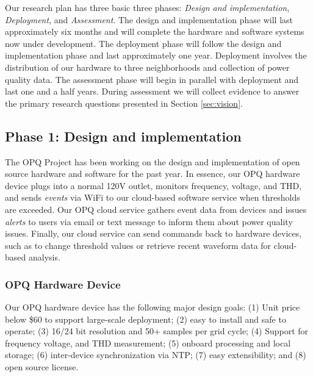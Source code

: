 \documentclass[11pt]{article}
\begin{document}

Our research plan has three basic three phases: {\em Design and implementation}, {\em Deployment}, and {\em Assessment}.  The design and implementation phase will last approximately six months and will complete the hardware and software systems now under development. The deployment phase will follow the design and implementation phase and last approximately one year. Deployment involves the distribution of our hardware to three neighborhoods and collection of power quality data.  The assessment phase will begin in parallel with deployment and last one and a half years. During assessment we will collect evidence to answer the primary research questions presented in Section \ref{sec:vision}.

\subsection{Phase 1: Design and implementation}

The OPQ Project has been working on the design and implementation of open source hardware and software for the past year. In essence, our OPQ hardware device plugs into a normal 120V outlet, monitors frequency, voltage, and THD, and sends {\em events} via WiFi to our cloud-based software service when thresholds are exceeded.  Our OPQ cloud service gathers event data from devices and issues {\em alerts} to users via email or text message to inform them about power quality issues. Finally, our cloud service can send commands back to hardware devices, such as to change threshold values or retrieve recent waveform data for cloud-based analysis.

\subsubsection{OPQ Hardware Device}

Our OPQ hardware device has the following major design goals: (1) Unit price below \$60 to support large-scale deployment; (2) easy to install and safe to operate; (3) 16/24 bit resolution and 50+ samples per grid cycle; (4) Support for frequency voltage, and THD measurement; (5) onboard processing and local storage; (6) inter-device synchronization via NTP; (7) easy extensibility; and (8) open source license. 
\end{document}
